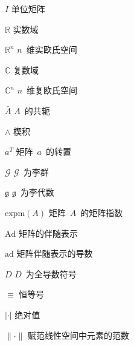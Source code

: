 \begin{denotation}
        \item[$I$]                       单位矩阵
        \item[$\mathbb{R}$]              实数域
        \item[$\mathbb{R}^n$]           $n$~维实欧氏空间
        \item[$\mathbb{C}$]              复数域
        \item[$\mathbb{C}^n$]          $n$~维复欧氏空间
        \item[$\bar{A}$]					$A$~的共轭
        \item[$\wedge$]					楔积
        \item[$a^T$]          矩阵~$a$~的转置
        \item[$\mathcal{G}$]              $\mathcal{G}$~为李群
        \item[$\mathfrak{g}$]              $\mathfrak{g}$~为李代数
        \item[$\mbox{expm}(A)$]                矩阵~$A$~的矩阵指数
        \item[$\mbox{Ad}$]           矩阵的伴随表示
        \item[$\mbox{ad}$]          矩阵伴随表示的导数
        \item[$D$]			$D$~为全导数符号
        \item[$\equiv$]                  恒等号
        \item[$| \cdot |$]               绝对值
        \item[$\| \cdot \|$]             赋范线性空间中元素的范数


\end{denotation}